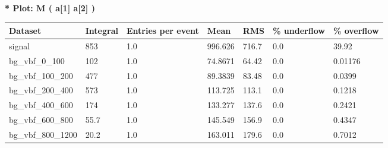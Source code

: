 \documentclass[a4paper, 10pt]{article}
\begin{document}
\textbf{* Plot: M ( a[1] a[2] ) }\\
   \begin{table}[H]
  \begin{center}
    \begin{tabular}{|m{23.0mm}|m{23.0mm}|m{18.0mm}|m{19.0mm}|m{19.0mm}|m{19.0mm}|m{19.0mm}|}
      \hline
      {\cellcolor{yellow}         Dataset}& {\cellcolor{yellow}         Integral}& {\cellcolor{yellow}         Entries per event}& {\cellcolor{yellow}         Mean}& {\cellcolor{yellow}         RMS}& {\cellcolor{yellow}         \% underflow}& {\cellcolor{yellow}         \% overflow}\\
      \hline
      {\cellcolor{white}         signal}& {\cellcolor{white}         853}& {\cellcolor{white}         1.0}& {\cellcolor{white}         996.626}& {\cellcolor{white}         716.7}& {\cellcolor{red}         0.0}& {\cellcolor{red}         39.92}\\
      \hline
      {\cellcolor{white}         bg\_vbf\_0\_100}& {\cellcolor{white}         102}& {\cellcolor{white}         1.0}& {\cellcolor{white}         74.8671}& {\cellcolor{white}         64.42}& {\cellcolor{green}         0.0}& {\cellcolor{green}         0.01176}\\
      \hline
      {\cellcolor{white}         bg\_vbf\_100\_200}& {\cellcolor{white}         477}& {\cellcolor{white}         1.0}& {\cellcolor{white}         89.3839}& {\cellcolor{white}         83.48}& {\cellcolor{green}         0.0}& {\cellcolor{green}         0.0399}\\
      \hline
      {\cellcolor{white}         bg\_vbf\_200\_400}& {\cellcolor{white}         573}& {\cellcolor{white}         1.0}& {\cellcolor{white}         113.725}& {\cellcolor{white}         113.1}& {\cellcolor{green}         0.0}& {\cellcolor{green}         0.1218}\\
      \hline
      {\cellcolor{white}         bg\_vbf\_400\_600}& {\cellcolor{white}         174}& {\cellcolor{white}         1.0}& {\cellcolor{white}         133.277}& {\cellcolor{white}         137.6}& {\cellcolor{green}         0.0}& {\cellcolor{green}         0.2421}\\
      \hline
      {\cellcolor{white}         bg\_vbf\_600\_800}& {\cellcolor{white}         55.7}& {\cellcolor{white}         1.0}& {\cellcolor{white}         145.549}& {\cellcolor{white}         156.9}& {\cellcolor{green}         0.0}& {\cellcolor{green}         0.4347}\\
      \hline
      {\cellcolor{white}         bg\_vbf\_800\_1200}& {\cellcolor{white}         20.2}& {\cellcolor{white}         1.0}& {\cellcolor{white}         163.011}& {\cellcolor{white}         179.6}& {\cellcolor{green}         0.0}& {\cellcolor{green}         0.7012}\\

\end{tabular}
\end{center}
\end{table}
\end{document}
